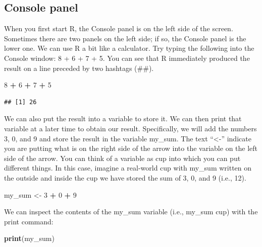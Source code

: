 \documentclass[
]{krantz}
\makeatletter
\newenvironment{Shaded}{\begin{snugshade}}{\end{snugshade}}
\newcommand{\DecValTok}[1]{\textcolor[rgb]{0.06,0.06,0.06}{#1}}
\newcommand{\KeywordTok}[1]{\textcolor[rgb]{0.27,0.27,0.27}{\textbf{#1}}}
\newcommand{\NormalTok}[1]{#1}
\newcommand{\OperatorTok}[1]{\textcolor[rgb]{0.43,0.43,0.43}{\textbf{#1}}}
\newcommand{\StringTok}[1]{\textcolor[rgb]{0.5,0.5,0.5}{#1}}
\newenvironment{kframe}{%
\medskip{}
\setlength{\fboxsep}{.8em}
 \def\at@end@of@kframe{}%
 \ifinner\ifhmode%
  \def\at@end@of@kframe{\end{minipage}}%
  \begin{minipage}{\columnwidth}%
 \fi\fi%
 \def\FrameCommand##1{\hskip\@totalleftmargin \hskip-\fboxsep
 \colorbox{shadecolor}{##1}\hskip-\fboxsep
     \hskip-\linewidth \hskip-\@totalleftmargin \hskip\columnwidth}%
 \MakeFramed {\advance\hsize-\width
   \@totalleftmargin\z@ \linewidth\hsize
   \@setminipage}}%
 {\par\unskip\endMakeFramed%
 \at@end@of@kframe}
\renewenvironment{Shaded}{\begin{kframe}}{\end{kframe}}
\makeatother
\begin{document}
\hypertarget{console-panel}{%
\subsection{Console panel}\label{console-panel}}

When you first start R, the Console panel is on the left side of the screen. Sometimes there are two panels on the left side; if so, the Console panel is the lower one. We can use R a bit like a calculator. Try typing the following into the Console window: 8 + 6 + 7 + 5. You can see that R immediately produced the result on a line preceded by two hashtags (\#\#).

\begin{Shaded}
\begin{Highlighting}[]
\DecValTok{8} \OperatorTok{+}\StringTok{ }\DecValTok{6} \OperatorTok{+}\StringTok{ }\DecValTok{7} \OperatorTok{+}\StringTok{ }\DecValTok{5}
\end{Highlighting}
\end{Shaded}

\begin{verbatim}
## [1] 26
\end{verbatim}

We can also put the result into a variable to store it. We can then print that variable at a later time to obtain our result. Specifically, we will add the numbers 3, 0, and 9 and store the result in the variable my\_sum. The text ``\textless-'' indicate you are putting what is on the right side of the arrow into the variable on the left side of the arrow. You can think of a variable as cup into which you can put different things. In this case, imagine a real-world cup with my\_sum written on the outside and inside the cup we have stored the sum of 3, 0, and 9 (i.e., 12).

\begin{Shaded}
\begin{Highlighting}[]
\NormalTok{my_sum <-}\StringTok{ }\DecValTok{3} \OperatorTok{+}\StringTok{ }\DecValTok{0} \OperatorTok{+}\StringTok{ }\DecValTok{9}
\end{Highlighting}
\end{Shaded}

We can inspect the contents of the my\_sum variable (i.e., my\_sum cup) with the print command:

\begin{Shaded}
\begin{Highlighting}[]
\KeywordTok{print}\NormalTok{(my_sum)}
\end{Highlighting}
\end{Shaded}
\end{document}
